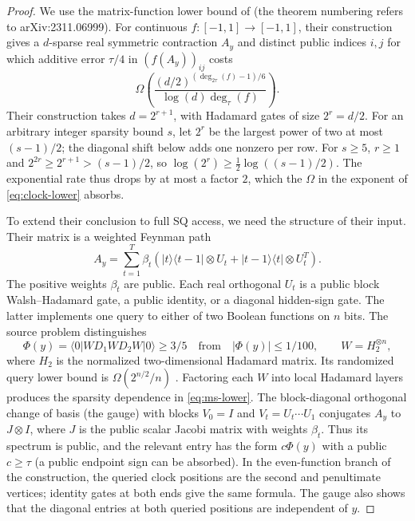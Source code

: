 \begin{proof}
We use the matrix-function lower bound of
\citet[Theorem 1.8, Corollary 5.1 and Section 5.1]{MontanaroShao2023}
(the theorem numbering refers to arXiv:2311.06999).
For continuous $f:[-1,1]\to[-1,1]$, their construction gives a
$d$-sparse real symmetric contraction $A_y$ and distinct public indices
$i,j$ for which additive error $\tau/4$ in $(f(A_y))_{ij}$ costs
\begin{equation}\label{eq:ms-lower}
 \Omega\left(
 \frac{(d/2)^{(\deg_{2\tau}(f)-1)/6}}
 {\log(d)\deg_\tau(f)}\right).
\end{equation}
Their construction takes $d=2^{r+1}$, with Hadamard gates of size
$2^r=d/2$. For an arbitrary integer sparsity bound $s$, let $2^r$ be the
largest power of two at most $(s-1)/2$; the diagonal shift below adds
one nonzero per row. For $s\geq5$, $r\geq1$ and
$2^{2r}\geq2^{r+1}>(s-1)/2$, so $\log(2^r)\geq\frac12\log((s-1)/2)$.
The exponential rate thus drops by at most a factor $2$, which the
$\Omega$ in the exponent of \eqref{eq:clock-lower} absorbs.

To extend their conclusion to full SQ access, we need the structure of
their input. Their matrix is a weighted Feynman path
\begin{equation}\label{eq:weighted-clock}
 A_y=\sum_{t=1}^{T}\beta_t
 (|t\rangle\langle t-1|\otimes U_t+
 |t-1\rangle\langle t|\otimes U_t^T).
\end{equation}
The positive weights $\beta_t$ are public. Each real orthogonal $U_t$ is
a public block Walsh--Hadamard gate, a public identity, or a diagonal
hidden-sign gate. The latter implements one query to either of two
Boolean functions on $n$ bits. The source problem distinguishes
\begin{equation}\label{eq:forrelation-promise}
 \Phi(y)=\langle0|W D_1 W D_2 W|0\rangle\geq3/5
 \quad\text{from}\quad |\Phi(y)|\leq1/100,
 \qquad W=H_2^{\otimes n},
\end{equation}
where $H_2$ is the normalized two-dimensional Hadamard matrix.
Its randomized query lower bound is $\Omega(2^{n/2}/n)$
\citep[Theorem 1]{AaronsonAmbainis2018}. Factoring each $W$ into local
Hadamard layers produces the sparsity dependence in \eqref{eq:ms-lower}.
The block-diagonal orthogonal change of basis (the gauge) with blocks
$V_0=I$ and $V_t=U_t\cdots U_1$ conjugates $A_y$ to $J\otimes I$, where
$J$ is the
public scalar Jacobi matrix with weights $\beta_t$. Thus its spectrum
is public, and the relevant entry has the form $c\Phi(y)$ with a
public $c\geq\tau$ (a public endpoint sign can be absorbed).
In the even-function branch of the construction, the queried clock
positions are the second and penultimate vertices; identity gates at
both ends give the same formula. The gauge also shows that the diagonal entries at both queried
positions are independent of $y$.


\end{proof}

